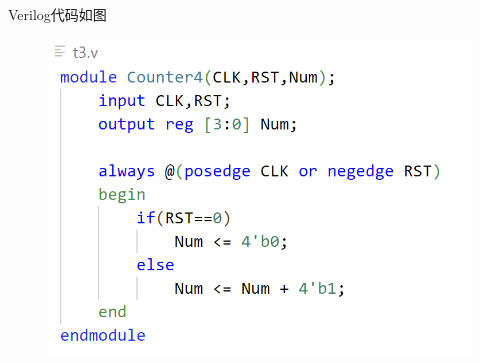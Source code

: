 \documentclass{article}
\begin{document}
    \clearpage
    Verilog代码如图
    \begin{figure}[htbp]
        \centering
        \includegraphics[scale=0.8]{t3v.png}
    \end{figure}
    \vspace*{3cm}
\end{document}
